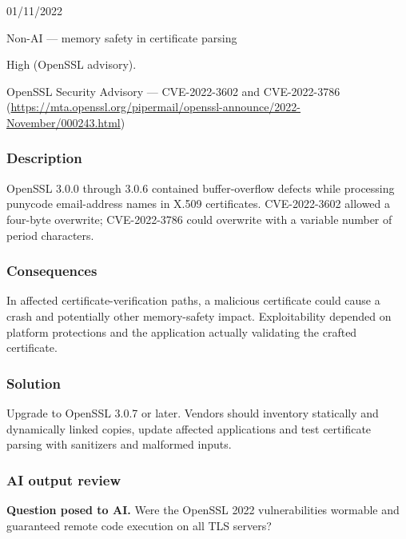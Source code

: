 \begin{description}[style=nextline,leftmargin=3.2cm]

\item[Publicized] 01/11/2022

\item[Category] Non-AI — memory safety in certificate parsing

\item[Severity] High (OpenSSL advisory).

\item[Source] OpenSSL Security Advisory — CVE-2022-3602 and CVE-2022-3786 (\url{https://mta.openssl.org/pipermail/openssl-announce/2022-November/000243.html})

\end{description}

\subsubsection{Description}

OpenSSL 3.0.0 through 3.0.6 contained buffer-overflow defects while processing punycode email-address names in X.509 certificates. CVE-2022-3602 allowed a four-byte overwrite; CVE-2022-3786 could overwrite with a variable number of period characters.

\subsubsection{Consequences}

In affected certificate-verification paths, a malicious certificate could cause a crash and potentially other memory-safety impact. Exploitability depended on platform protections and the application actually validating the crafted certificate.

\subsubsection{Solution}

Upgrade to OpenSSL 3.0.7 or later. Vendors should inventory statically and dynamically linked copies, update affected applications and test certificate parsing with sanitizers and malformed inputs.

\subsubsection{AI output review}

\textbf{Question posed to AI.} Were the OpenSSL 2022 vulnerabilities wormable and guaranteed remote code execution on all TLS servers?

